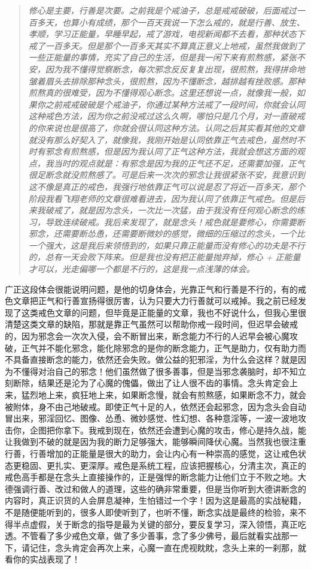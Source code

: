 \begin{quote}\it
    修心是主要，行善是次要。之前我是个戒油子，总是戒戒破破，后面戒过一百多天，也算小有成绩，那个一百天我说一下怎么戒的，就是行善、放生、孝顺，学习正能量，早睡早起，戒了游戏，电视新闻都不去看，那种状态下戒了一百多天。但是那个一百多天其实不算真正意义上地戒，虽然我做到了一些正能量的事情，充实了自己的生活，但是我一闲下来有煎熬感，紧张不安，因为我不懂得觉察断念，每次邪念反反复复出现，很煎熬，我得拼命地皱着眉头去排除那种念头，很煎熬，因为不懂断念，越排越有挫败感。那种煎熬真的很难受，因为不懂得观心断念。这里还想说一点，就像我一般，如果你之前戒戒破破是个戒油子，你通过某种方法戒了一段时间，你就会认同这种戒色方法，因为你之前没戒过这么久啊，哪怕只是几个月，对一直破戒的你来说也是很高了，你就会很认同这种方法。认同之后其实看其他的文章就没有那么好契入了，就像我，我刚开始是认同依靠正气去戒色，虽然时不时有邪念有煎熬感，但是因为我认同了正气这种方法，我就会想这方面的观点，我当时的观点就是：有邪念是因为我的正气还不足，还需要加强，正气很足断念就没煎熬感了。可是后来一次次的邪念让我很紧张不安，我意识到这不像是真正的戒色，我强行地依靠正气可以说是忍了将近一百多天，那个阶段我看飞翔老师的文章很难看进去，因为我认同了依靠正气戒色。但是后来我破戒了，就是因为念头，一次比一次猛，由于我没有任何观心断念的练习，导致连续破戒。我后来发现了，就是念头！戒色就是要修心，你需要断邪念，还需要断怂恿，还需要断微妙的感觉，微细的压缩过的念头，一个比一个强大，这是我后来领悟到的，如果只靠正能量而没有修心的功夫是不行的，总有一天会败下阵来。但是我也没有把正能量抛弃掉，修心 + 正能量才可以，光走偏哪一个都是不行的，这是我一点浅薄的体会。
\end{quote}

广正这段体会很能说明问题，是他的切身体会，光靠正气和行善是不行的，有的戒色文章把正气和行善宣扬得很厉害，认为只要大力行善就可以戒掉。我之前已经发现了这类戒色文章的问题，但毕竟是正能量的文章，我也不好说什么，但我心里很清楚这类文章的缺陷，那就是靠正气虽然可以帮助你戒一段时间，但迟早会破戒的，因为邪念会一次次入侵，会不断冒出来，断念能力不行的人迟早会被心魔攻破，正气并不能化邪念，能化除邪念的是你的断念能力，正气是助力，仅有助力而不具备直接断念的能力，依然还会失败。做公益的犯邪淫，为什么会这样？就是因为不懂得对治自己的邪念！他们虽然做了很多善事，但是当邪念袭脑时，却不知立刻断除，结果还是沦为了心魔的傀儡，做出了让人很不齿的事情。念头肯定会上来，猛烈地上来，疯狂地上来，如果断念慢，就会有煎熬感，如果断念不力，就会被附体，身不由己地破戒。即使正气十足的人，依然还会起邪念，因为念头会自动冒出来，邪淫回忆、图像、怂恿、微妙感觉、性幻想、各种意淫等，一波一波地攻击你，企图把你拿下。我戒到现在，依然还会遭到心魔的攻击，修心是持久战，能让我做到不破的就是因为我的断力足够强大，能够瞬间降伏心魔。当然我也很注重行善，行善增加的正能量是很大的助力，会让内心有一种崇高的感觉，这让戒色状态更稳固、更扎实、更深厚。戒色是系统工程，应该把握核心，分清主次，真正的戒色高手都是在念头上直接操作的，正是强悍的断念能力让他们立于不败之地。大德强调行善、改过和做人的道理，这些的确非常重要，但是当你听到大德讲断念的内容时，真正识货的人会屏息凝神，生怕错过一个字！因为这是最高的实战秘籍，不是随便能听到的，很多人即使听到了，也听不懂，断念实战是最终的检验，来不得半点虚假，关于断念的指导是最为关键的部分，要反复学习，深入领悟，真正吃透。不管看了多少戒色文章，做了多少善事，念了多少佛号，最后就看实战那一下，请记住，念头肯定会再次上来，心魔一直在虎视眈眈，念头上来的一刹那，就看你的实战表现了！


